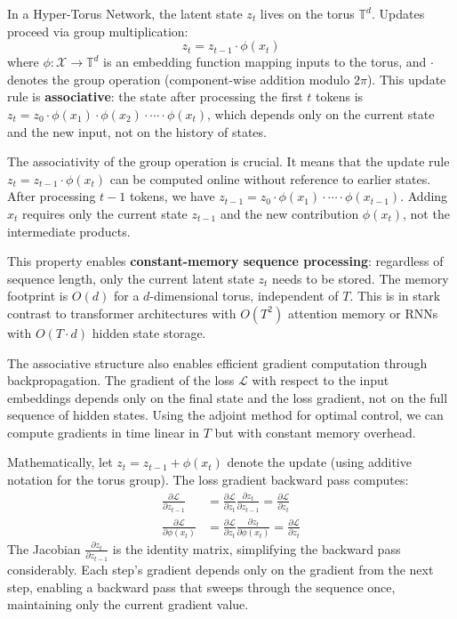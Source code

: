 \documentclass[12pt,letterpaper,twoside]{article}
\newcommand{\T}{\mathbb{T}}
\begin{document}
In a Hyper-Torus Network, the latent state $z_t$ lives on the torus $\T^d$. Updates proceed via group multiplication:
\begin{equation}
z_t = z_{t-1} \cdot \phi(x_t)
\end{equation}
where $\phi: \mathcal{X} \to \T^d$ is an embedding function mapping inputs to the torus, and $\cdot$ denotes the group operation (component-wise addition modulo $2\pi$). This update rule is \textbf{associative}: the state after processing the first $t$ tokens is $z_t = z_0 \cdot \phi(x_1) \cdot \phi(x_2) \cdot \cdots \cdot \phi(x_t)$, which depends only on the current state and the new input, not on the history of states.

The associativity of the group operation is crucial. It means that the update rule $z_t = z_{t-1} \cdot \phi(x_t)$ can be computed online without reference to earlier states. After processing $t-1$ tokens, we have $z_{t-1} = z_0 \cdot \phi(x_1) \cdot \cdots \cdot \phi(x_{t-1})$. Adding $x_t$ requires only the current state $z_{t-1}$ and the new contribution $\phi(x_t)$, not the intermediate products.

This property enables \textbf{constant-memory sequence processing}: regardless of sequence length, only the current latent state $z_t$ needs to be stored. The memory footprint is $O(d)$ for a $d$-dimensional torus, independent of $T$. This is in stark contrast to transformer architectures with $O(T^2)$ attention memory or RNNs with $O(T \cdot d)$ hidden state storage.

The associative structure also enables efficient gradient computation through backpropagation. The gradient of the loss $\mathcal{L}$ with respect to the input embeddings depends only on the final state and the loss gradient, not on the full sequence of hidden states. Using the adjoint method for optimal control, we can compute gradients in time linear in $T$ but with constant memory overhead.

Mathematically, let $z_t = z_{t-1} + \phi(x_t)$ denote the update (using additive notation for the torus group). The loss gradient backward pass computes:
\begin{align}
\frac{\partial \mathcal{L}}{\partial z_{t-1}} &= \frac{\partial \mathcal{L}}{\partial z_t} \frac{\partial z_t}{\partial z_{t-1}} = \frac{\partial \mathcal{L}}{\partial z_t} \\
\frac{\partial \mathcal{L}}{\partial \phi(x_t)} &= \frac{\partial \mathcal{L}}{\partial z_t} \frac{\partial z_t}{\partial \phi(x_t)} = \frac{\partial \mathcal{L}}{\partial z_t}
\end{align}
The Jacobian $\frac{\partial z_t}{\partial z_{t-1}}$ is the identity matrix, simplifying the backward pass considerably. Each step's gradient depends only on the gradient from the next step, enabling a backward pass that sweeps through the sequence once, maintaining only the current gradient value.
\end{document}
